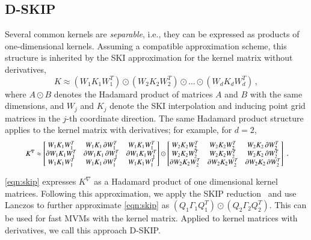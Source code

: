 \subsection{D-SKIP}

Several common kernels are {\em separable}, i.e., they can be expressed as
products of one\hyp{}dimensional kernels.  Assuming a compatible approximation
scheme, this structure is inherited by the SKI approximation for the kernel
matrix without derivatives,
\begin{equation}\label{eqn:ski_sep}
  K \approx (W_1 K_1 W_1^T) \odot (W_2 K_2 W_2^T) \odot \ldots \odot (W_d K_d
  W_d^T)\,,
\end{equation}
where $A \odot B$ denotes the Hadamard product of matrices $A$ and $B$ with the
same dimensions, and $W_j$ and $K_j$ denote the SKI interpolation and inducing
point grid matrices in the $j$\hyp{}th coordinate direction. The same Hadamard
product structure applies to the kernel matrix with derivatives; for example,
for $d = 2$,
\begin{equation} \label{eqn:skip}
  \resizebox{.9\hsize}{!}{
    $K^{\nabla} \approx
    \begin{bmatrix}
        W_1 K_1 W_1^T      & W_1 K_1 \dx W_1^T     & W_1 K_1 W_1^T \\
        \dx W_1 K_1 W_1^T  & \dx W_1 K_1 \dx W_1^T & \dx W_1 K_1 W_1^T \\
        W_1 K_1 W_1^T      & W_1 K_1 \dx W_1^T     & W_1 K_1 W_1^T \\
    \end{bmatrix}
    \odot
    \begin{bmatrix}
        W_2 K_2 W_2^T      & W_2 K_2 W_2^T      & W_2 K_2 \dx W_2^T \\
        W_2 K_2 W_2^T      & W_2 K_2 W_2^T      & W_2 K_2 \dx W_2^T \\
        \dx W_2 K_2 W_2^T  & \dx W_2 K_2 W_2^T  & \dx W_2 K_2 \dx W_2^T \\
    \end{bmatrix}$
  }\,.
\end{equation}

\cref{eqn:skip} expresses $K^{\nabla}$ as a Hadamard product of one dimensional
kernel matrices. Following this approximation, we apply the SKIP reduction~
\citep{gardner2018product} and use Lanczos to further approximate 
\cref{eqn:skip} as $(Q_1 \Gamma_1 Q_1^T) \odot (Q_2 \Gamma_2 Q_2^T)$. This can
be used for fast MVMs with the kernel matrix. Applied to kernel matrices with
derivatives, we call this approach D\hyp{}SKIP.

